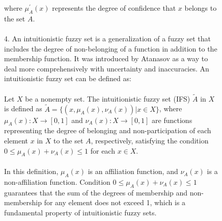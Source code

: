 \documentclass{article}
\begin{document}
\begin{figure}[!t]
\begin{minipage}{0.49\textwidth}
            ~\\
            ~\\
            ~\\
            ~\\
            ~\\
            ~\\
            ~\\
            ~\\
            ~\\
            ~\\
            ~\\
            ~\\
            ~\\
            ~\\
            ~\\
            ~\\
            ~\\
        \end{minipage}
        \hspace{0.5cm}
        \begin{minipage}{0.49\textwidth}
            where \(\mu_{A}^{'}(x)\) represents the degree of confidence that \(x\) belongs to the set \(A\).\\
            ~\\
            4. An intuitionistic fuzzy set is a generalization of a fuzzy set that includes the degree of non-belonging of a function in addition to the membership function. It was introduced by Atanasov as a way to deal more comprehensively with uncertainty and inaccuracies. An intuitionistic fuzzy set can be defined as:\\
            ~\\
            Let $X$ be a nonempty set. The intuitionistic fuzzy set (IFS) $\tilde{A}$ in $X$ is defined as $\tilde{A} = \{(x,\mu_A(x), \nu_A(x)) | x \in X\}$, where $\mu_A(x): X\rightarrow [0,1]$ and $\nu_A(x): X\rightarrow [0,1]$ are functions representing the degree of belonging and non-participation of each element $x$ in $X$ to the set $A$, respectively, satisfying the condition $0\leq\mu_A(x) + \nu_A(x) \leq 1$ for each $x\in X$.\\
            ~\\
            In this definition, $\mu_A(x)$ is an affiliation function, and $\nu_A(x)$ is a non-affiliation function. Condition $0 \leq \mu_A(x) + \nu_A(x)\leq 1$ guarantees that the sum of the degrees of membership and non-membership for any element does not exceed 1, which is a fundamental property of intuitionistic fuzzy sets.\\

\end{minipage}
\end{figure}
\end{document}
